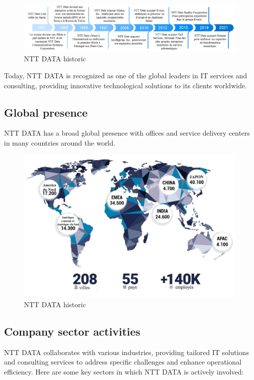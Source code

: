 \begin{figure}[h!]
	\centering
	\includegraphics[width=0.8\linewidth]{Image/ntthistoric.png}
	\caption{NTT DATA historic}
	\label{fig:NTT DATA historic}
\end{figure}

Today, NTT DATA is recognized as one of the global leaders in IT services and consulting, providing innovative technological solutions to its clients worldwide.

\subsection{Global presence}
NTT DATA has a broad global presence with offices and service delivery centers in many countries around the world.
\begin{figure}[h!]
	\centering
	\includegraphics[width=0.8\linewidth]{Image/nttmap.png}
	\caption{NTT DATA historic}
	\label{fig:NTT DATA historic}
\end{figure}

\pagebreak
\subsection{Company sector activities}

NTT DATA collaborates with various industries, providing tailored IT solutions and consulting services to address specific challenges and enhance operational efficiency. Here are some key sectors in which NTT DATA is actively involved:

